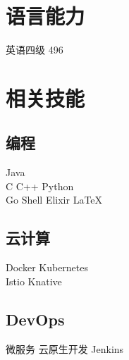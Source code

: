 \documentclass[]{deedy-resume-openfont}
\begin{document}
\begin{minipage}[t]{0.3\textwidth}
\sectionsep

\section{语言能力}
\sectionsep
英语四级 496 \\
\sectionsep


\section{相关技能}
\sectionsep
\subsection{编程}
Java   \\
C \textbullet{} C++ \textbullet{}  Python  \\
Go \textbullet{} Shell \textbullet{} Elixir \textbullet{} \LaTeX\ \\ 
\sectionsep

\subsection{云计算}
Docker \textbullet{} Kubernetes   \\
Istio \textbullet{} Knative  \\
\sectionsep

\subsection{DevOps}
微服务 \textbullet{} 云原生开发 \textbullet{} Jenkins 
\sectionsep



%
%

\end{minipage}
\end{document}
